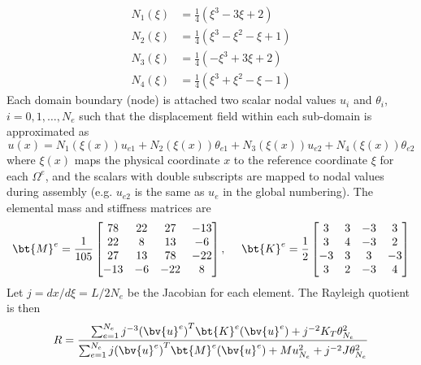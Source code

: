 \begin{enumerate}[(i)]
{    \begin{equation}
    \begin{aligned}
        N_1(\xi) &= \frac{1}{4}(\xi^3 - 3\xi + 2) \\
        N_2(\xi) &= \frac{1}{4}(\xi^3-\xi^2-\xi+1) \\
        N_3(\xi) &= \frac{1}{4}(-\xi^3+3\xi+2) \\
        N_4(\xi) &= \frac{1}{4}(\xi^3+\xi^2-\xi-1)
    \end{aligned}
    \end{equation}
    Each domain boundary (node) is attached two scalar nodal values $u_i$ and $\theta_i$, $i = 0, 1, \ldots, N_e$ such that the displacement field within each sub-domain is approximated as 
    \begin{equation}\label{eqn:hw5_p3_synthesis}
        u(x) = N_1(\xi(x)) u_{e1} + N_2(\xi(x)) \theta_{e1} + N_3(\xi(x)) u_{e2} + N_4(\xi(x)) \theta_{e2}
    \end{equation}
    where $\xi(x)$ maps the physical coordinate $x$ to the reference coordinate $\xi$ for each $\Omega^e$, and the scalars with double subscripts are mapped to nodal values during assembly (e.g. $u_{e2}$ is the same as $u_{e}$ in the global numbering). 
    The elemental mass and stiffness matrices are 
    \begin{equation}
        \bt{M}^e = \frac{1}{105}\begin{bmatrix}
            78  & 22 & 27  & -13 \\
            22  & 8  & 13  & -6  \\
            27  & 13 & 78  & -22 \\
            -13 & -6 & -22 & 8 
        \end{bmatrix}, ~~~~ 
        \bt{K}^e = \frac{1}{2}\begin{bmatrix}
            3  & 3 & -3 & 3  \\
            3  & 4 & -3 & 2  \\
            -3 & 3 & 3  & -3 \\
            3  & 2 & -3 & 4
        \end{bmatrix}
    \end{equation}
    Let $j = dx / d\xi = L / 2N_e$ be the Jacobian for each element. 
    The Rayleigh quotient is then 
    \begin{equation}
        R = \frac{
            \sum_{e=1}^{N_e} j^{-3}{(\bv{u}^e)}^T \bt{K}^e (\bv{u}^e) + j^{-2} K_T \theta_{N_e}^2
        }{
            \sum_{e=1}^{N_e} j{(\bv{u}^e)}^T \bt{M}^e (\bv{u}^e) + M u_{N_e}^2 + j^{-2} J \theta_{N_e}^2
}
\end{equation}}
\end{enumerate}
